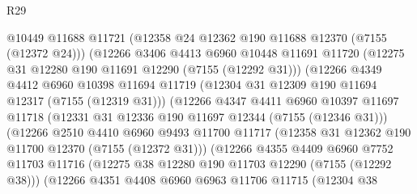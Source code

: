\begin{lexlean}{R29}
\begin{coremodule}
                              @10449
                              @11688
                              @11721
                              (@12358 @24 @12362 @190 @11688 @12370 (@7155 (@12372 @24)))
                              (@12266
                                @3406
                                @4413
                                @6960
                                @10448
                                @11691
                                @11720
                                (@12275 @31 @12280 @190 @11691 @12290 (@7155 (@12292 @31)))
                                (@12266
                                  @4349
                                  @4412
                                  @6960
                                  @10398
                                  @11694
                                  @11719
                                  (@12304 @31 @12309 @190 @11694 @12317 (@7155 (@12319 @31)))
                                  (@12266
                                    @4347
                                    @4411
                                    @6960
                                    @10397
                                    @11697
                                    @11718
                                    (@12331 @31 @12336 @190 @11697 @12344 (@7155 (@12346 @31)))
                                    (@12266
                                      @2510
                                      @4410
                                      @6960
                                      @9493
                                      @11700
                                      @11717
                                      (@12358 @31 @12362 @190 @11700 @12370 (@7155 (@12372 @31)))
                                      (@12266
                                        @4355
                                        @4409
                                        @6960
                                        @7752
                                        @11703
                                        @11716
                                        (@12275 @38 @12280 @190 @11703 @12290 (@7155 (@12292 @38)))
                                        (@12266
                                          @4351
                                          @4408
                                          @6960
                                          @6963
                                          @11706
                                          @11715
                                          (@12304
                                            @38

\end{coremodule}
\end{lexlean}
